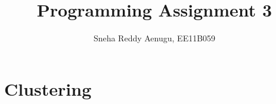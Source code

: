 \documentclass[12pt]{article}
\begin{document}
 
 
 
\title{Programming Assignment 3}%
\author{Sneha Reddy Aenugu, EE11B059\\ %
} %
 
\maketitle

\section{Clustering}
 
\end{document}
